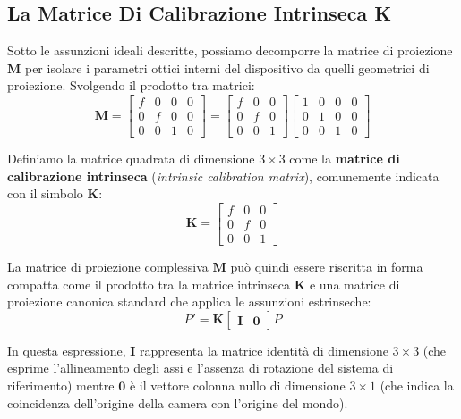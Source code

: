 ﻿\documentclass[11pt, a4paper]{article}
\begin{document}
\newpage

\subsection{La Matrice Di Calibrazione Intrinseca K}

Sotto le assunzioni ideali descritte, possiamo decomporre la matrice di proiezione $\bm{M}$ per isolare i parametri ottici interni del dispositivo da quelli geometrici di proiezione. Svolgendo il prodotto tra matrici:
\begin{equation}
    \bm{M} = \begin{bmatrix} f & 0 & 0 & 0 \\ 0 & f & 0 & 0 \\ 0 & 0 & 1 & 0 \end{bmatrix} = \begin{bmatrix} f & 0 & 0 \\ 0 & f & 0 \\ 0 & 0 & 1 \end{bmatrix} \begin{bmatrix} 1 & 0 & 0 & 0 \\ 0 & 1 & 0 & 0 \\ 0 & 0 & 1 & 0 \end{bmatrix}
\end{equation}

Definiamo la matrice quadrata di dimensione $3 \times 3$ come la \textbf{matrice di calibrazione intrinseca} (\emph{intrinsic calibration matrix}), comunemente indicata con il simbolo $\bm{K}$:
\begin{equation}
    \boxed{\bm{K} = \begin{bmatrix} f & 0 & 0 \\ 0 & f & 0 \\ 0 & 0 & 1 \end{bmatrix}}
\end{equation}

La matrice di proiezione complessiva $\bm{M}$ può quindi essere riscritta in forma compatta come il prodotto tra la matrice intrinseca $\bm{K}$ e una matrice di proiezione canonica standard che applica le assunzioni estrinseche:
\begin{equation}
    P' = \bm{K} \begin{bmatrix} \bm{I} & \bm{0} \end{bmatrix} P
\end{equation}

In questa espressione, $\bm{I}$ rappresenta la matrice identità di dimensione $3 \times 3$ (che esprime l'allineamento degli assi e l'assenza di rotazione del sistema di riferimento) mentre $\bm{0}$ è il vettore colonna nullo di dimensione $3 \times 1$ (che indica la coincidenza dell'origine della camera con l'origine del mondo).
\end{document}
